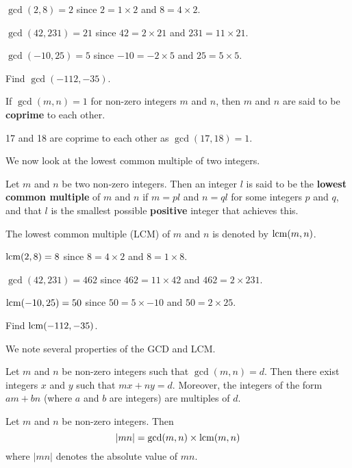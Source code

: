 \begin{example}
    $\gcd(2, 8) = 2$ since $2 = 1 \times 2$ and $8 = 4 \times 2$.
\end{example}
\begin{example}
    $\gcd(42, 231) = 21$ since $42 = 2 \times 21$ and $231 = 11 \times 21$.
\end{example}
\begin{example}
    $\gcd(-10, 25) = 5$ since $-10 = -2 \times 5$ and $25 = 5 \times 5$.
\end{example}
\begin{exercise}
    Find $\gcd(-112, -35)$.
\end{exercise}

\begin{remark}
    If $\gcd(m, n) = 1$ for non-zero integers $m$ and $n$, then $m$ and $n$ are said to be \textbf{coprime} to each other.
\end{remark}
\begin{example}
    17 and 18 are coprime to each other as $\gcd(17, 18) = 1$.
\end{example}

We now look at the lowest common multiple of two integers.
\begin{definition}
    Let $m$ and $n$ be two non-zero integers. Then an integer $l$ is said to be the \textbf{lowest common multiple} of $m$ and $n$ if $m = pl$ and $n = ql$ for some integers $p$ and $q$, and that $l$ is the smallest possible \textbf{positive} integer that achieves this.
\end{definition}
The lowest common multiple (LCM) of $m$ and $n$ is denoted by $\mathrm{lcm}(m,n)$.

\begin{example}
    $\mathrm{lcm}(2, 8) = 8$ since $8 = 4 \times 2$ and $8 = 1 \times 8$.
\end{example}
\begin{example}
    $\gcd(42, 231) = 462$ since $462 = 11 \times 42$ and $462 = 2 \times 231$.
\end{example}
\begin{example}
    $\mathrm{lcm}(-10, 25) = 50$ since $50 = 5 \times -10$ and $50 = 2 \times 25$.
\end{example}
\begin{exercise}
    Find $\mathrm{lcm}(-112, -35)$.
\end{exercise}

\newpage

We note several properties of the GCD and LCM.
\begin{lemma}[Bézout]\label{lemma-bezout}
    Let $m$ and $n$ be non-zero integers such that $\gcd(m, n) = d$. Then there exist integers $x$ and $y$ such that $mx + ny = d$. Moreover, the integers of the form $am + bn$ (where $a$ and $b$ are integers) are multiples of $d$.
\end{lemma}
\begin{proposition}
    Let $m$ and $n$ be non-zero integers. Then
    \[
        |mn| = \gcd(m,n) \times \mathrm{lcm}(m,n)    
    \]
    where $|mn|$ denotes the absolute value of $mn$.
\end{proposition}

